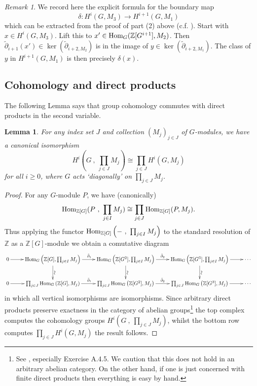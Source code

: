 \documentclass[11pt]{amsart}
\numberwithin{equation}{section}
\newtheorem{lemma}[equation]{Lemma}
\theoremstyle{remark}
\newtheorem{remark}[equation]{Remark}
\theoremstyle{remark}
\theoremstyle{remark}
\theoremstyle{definition}
\theoremstyle{definition}
\theoremstyle{definition}
\theoremstyle{definition}
\theoremstyle{definition}
\theoremstyle{definition}
\begin{document}
\begin{remark} \label{explicit boundary 1}
We record here the explicit formula for the boundary map
\[\delta:H^i(G,M_3)\rightarrow  H^{i+1}(G,M_1)\]
 which can be extracted from the proof of part (2) above (c.f. ). Start with $x\in H^i(G,M_3)$. Lift this to $x'\in \textup{Hom}_G(\mathbb{Z}[G^{i+1}],M_2)$. Then $\tilde{\partial}_{i+1}(x') \in\ker(\tilde{\partial}_{i+2,M_2})$ is in the image of $y\in \ker(\tilde{\partial}_{i+2,M_1})$. The class of $y$ in $H^{i+1}(G,M_1)$  is then precisely $\delta(x)$. 
\end{remark}

\subsection{Cohomology and direct products}

The following Lemma says that group cohomology commutes with direct products in the second variable.

\begin{lemma} \label{cohom and product abelian}
For any index set $J$ and collection $(M_j)_{j\in J}$ of $G$-modules, we have a canonical isomorphism
\[H^i(G~,~\prod_{j\in J}M_j)\cong \prod_{j\in J}H^i(G,M_j)\]
for all $i\geq 0$, where $G$ acts `diagonally' on $\prod_{j\in J}M_j$.
\end{lemma}

\begin{proof}
For any $G$-module $P$, we have (canonically) 
\[\textup{Hom}_{\mathbb{Z}[G]}(P~,~\prod_{j\in I}M_j)\cong \prod_{j\in J}\textup{Hom}_{\mathbb{Z}[G]}(P,M_j).\]
Thus applying the functor $\textup{Hom}_{\mathbb{Z}[G]}\left(-~,~\prod_{j\in I}M_j\right)$ to the standard resolution of $\mathbb{Z}$ as a $\mathbb{Z}[G]$-module we obtain a comutative diagram
\[
\xymatrix{0\ar[r]&\textup{Hom}_{G}\left(\mathbb{Z}[G],\prod_{j\in I}M_j\right)\ar[r]^{\tilde{\partial}_1}\ar[d]^*[@]{\sim}&\textup{Hom}_{G}\left(\mathbb{Z}[G^2],\prod_{j\in I}M_j\right)\ar[r]^{\tilde{\partial}_2}\ar[d]^*[@]{\sim}& \textup{Hom}_{G}\left(\mathbb{Z}[G^3],\prod_{j\in I}M_j\right)\ar[r]\ar[d]^*[@]{\sim}&\cdots \\ 0\ar[r]&\prod_{j\in J}\textup{Hom}_{G}\left(\mathbb{Z}[G],M_j\right)\ar[r]^{\tilde{\partial}_1}&
\prod_{j\in J}\textup{Hom}_{G}\left(\mathbb{Z}[G^2],M_j\right)\ar[r]^{\tilde{\partial}_2} &\prod_{j\in J}\textup{Hom}_{G}\left(\mathbb{Z}[G^3],M_j\right)\ar[r]&\cdots}
\] 
in which all vertical isomorphisms are isomorphisms. Since arbitrary direct products preserve exactness in the category of abelian groups\footnote{See \cite[Appendix A.4]{MR1269324}, especially Exercise A.4.5. We caution that this does not hold in an arbitrary abelian category. On the other hand, if one is just concerned with finite direct products then everything is easy by hand.} the top complex computes the cohomology groups $H^i\left(G~,~\prod_{j\in J}M_j\right)$, whilst the bottom row computes $\prod_{j\in J}H^i(G,M_j)$ the result follows.
\end{proof}
\end{document}
